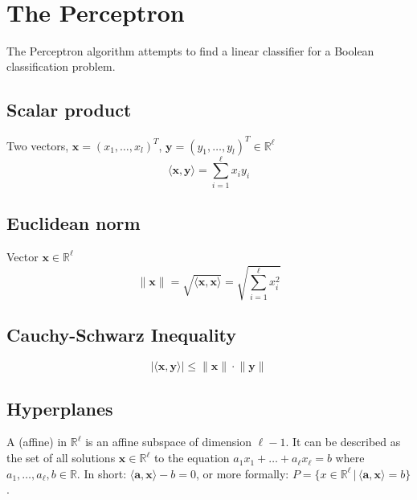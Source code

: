 \begin{algorithmic}
	\Else
	\EndIf\\
\end{algorithmic}

\section{The Perceptron}
The Perceptron algorithm attempts to find a linear classifier for a Boolean classification problem.
\subsection{Scalar product}
Two vectors, $\mathbf{x} = (x_1,\ldots,x_l)^T$, $\mathbf{y} = (y_1,\ldots,y_l)^T \in \mathbb{R}^\ell$ 
\begin{equation*}
\langle \mathbf{x},\mathbf{y} \rangle = \sum_{i=1}^{\ell} x_iy_i
\end{equation*}
\subsection{Euclidean norm}
Vector $\mathbf{x} \in \mathbb{R}^\ell$ 
\begin{equation*}
\lVert \mathbf{x} \rVert = \sqrt{\langle \mathbf{x},\mathbf{x} \rangle} = \sqrt{ \sum_{i=1}^{\ell} x_i^2}
\end{equation*}
\subsection{Cauchy-Schwarz Inequality}
\begin{equation}
| \langle \mathbf{x},\mathbf{y} \rangle | \leq \lVert \mathbf{x} \rVert \cdot \lVert \mathbf{y} \rVert
\end{equation}

\subsection{Hyperplanes}
A (affine)  in $\mathbb{R}^\ell$ is an affine subspace of dimension $\ell -1$. It can be described as the set of all solutions $\mathbf{x} \in \mathbb{R}^\ell$ to the equation $a_1x_1 + \ldots + a_\ell x_\ell = b$ where $a_1,\ldots,a_\ell,b \in \mathbb{R}$. In short:  $\langle\mathbf{a}, \mathbf{x}\rangle - b=0$, or more formally: $P = \{x \in \mathbb{R}^\ell\,|\,\langle\mathbf{a}, \mathbf{x}\rangle = b\}$.

